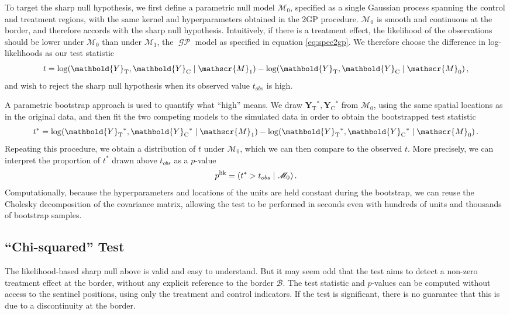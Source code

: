 \documentclass[letter,12pt]{article}
\DeclarePairedDelimiter{\parenthesis}{\lparen}{\rparen}
\newcommand{\del}[1]{\parenthesis*{#1}}
\let\Pr\relax
\DeclareMathOperator{\Pr}{\mathbb{P}}
\DeclareMathOperator{\GP}{\mathcal{GP}}
\newcommand{\treat}{\mathrm{T}}
\newcommand{\ctrol}{\mathrm{C}}
\newcommand{\Yvec}{\mathbold{Y}}
\newcommand{\yt}{\Yvec_{\treat}}
\newcommand{\yc}{\Yvec_{\ctrol}}
\newcommand{\border}{\mathcal{B}}
\newcommand{\modnull}{\mathscr{M}_0}
\newcommand{\modalt}{\mathscr{M}_1}
\begin{document}
To target the sharp null hypothesis, we first define a parametric null model \(\modnull\),
specified as a single Gaussian process spanning the control and treatment regions,
with the same kernel and hyperparameters obtained in the 2GP procedure.
\(\modnull\) is smooth and continuous at the border,
and therefore accords with the sharp null hypothesis.
Intuitively, if there is a treatment effect,
the likelihood of the observations should be lower under \(\modnull\) than under \(\modalt\),
the \(\GP\) model as specified in equation \eqref{eq:spec2gp}.
We therefore choose the difference in log-likelihoods as our test statistic
\begin{equation}
    t = \log \Pr\del{\yt{}, \yc{} \mid \modalt} - \log \Pr\del{\yt{}, \yc{} \mid \modnull} \,,
\end{equation}
and wish to reject the sharp null hypothesis when its observed value \(t_{obs}\) is high.

A parametric bootstrap approach is used to quantify what ``high'' means. We draw \(\yt{}^*,\yc{}^*\) from \(\modnull\),
using the same spatial locations as in the original data,
and then fit the two competing models to the simulated data in order to obtain the bootstrapped test statistic
\begin{equation}
    t^* = \log \Pr\del{\yt{}^*, \yc{}^* \mid \modalt} - \log \Pr\del{\yt{}^*, \yc{}^* \mid \modnull}\,.
\end{equation}
Repeating this procedure, we obtain a distribution of \(t\) under \(\modnull\),
which we can then compare to the observed \(t\).
More precisely, we can interpret the proportion of \(t^*\) drawn above \(t_{obs}\) as a \(p\)-value
\begin{equation}
    p^{\mathrm{lik}} = \Pr\del{t^* > t_{obs} \mid \modnull}\,.
\end{equation}
Computationally, because the hyperparameters and locations of the units are held constant during the bootstrap, we can reuse the Cholesky decomposition of the covariance matrix, allowing the test to be performed in seconds even with hundreds of units and thousands of bootstrap samples.



\hypertarget{chi-squared-test}{%
\subsection{``Chi-squared'' Test}\label{chi-squared-test}}

The likelihood-based sharp null above is valid and easy to understand.
But it may seem odd that the test aims to detect a non-zero treatment effect at the border, without any explicit reference to the border \(\border\).
The test statistic and \(p\)-values can be computed without access to the sentinel positions, using only the treatment and control indicators.
If the test is significant, there is no guarantee that this is due to a discontinuity at the border.
\end{document}
